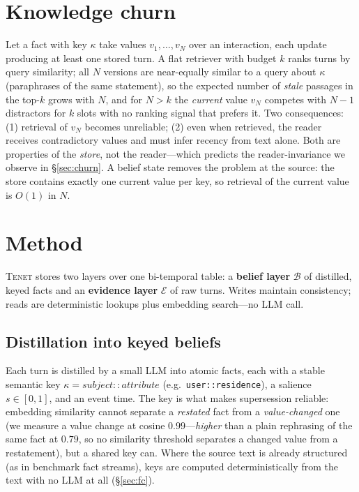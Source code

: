 \documentclass[11pt]{article}
\newcommand{\tenet}{\textsc{Tenet}}
\begin{document}
\section{Knowledge churn}\label{sec:problem}
Let a fact with key $\kappa$ take values $v_1,\dots,v_N$ over an interaction, each update
producing at least one stored turn. A flat retriever with budget $k$ ranks turns by
query similarity; all $N$ versions are near-equally similar to a query about $\kappa$
(paraphrases of the same statement), so the expected number of \emph{stale} passages in
the top-$k$ grows with $N$, and for $N>k$ the \emph{current} value $v_N$ competes with
$N-1$ distractors for $k$ slots with no ranking signal that prefers it. Two consequences:
(1) retrieval of $v_N$ becomes unreliable; (2) even when retrieved, the reader receives
contradictory values and must infer recency from text alone. Both are properties of the
\emph{store}, not the reader---which predicts the reader-invariance we observe in
\S\ref{sec:churn}. A belief state removes the problem at the source: the store contains
exactly one current value per key, so retrieval of the current value is $O(1)$ in $N$.

\section{Method}\label{sec:method}
\tenet{} stores two layers over one bi-temporal table: a \textbf{belief layer}
$\mathcal{B}$ of distilled, keyed facts and an \textbf{evidence layer} $\mathcal{E}$ of
raw turns. Writes maintain consistency; reads are deterministic lookups plus embedding
search---no LLM call.

\subsection{Distillation into keyed beliefs}
Each turn is distilled by a small LLM into atomic facts, each with a stable semantic key
$\kappa=\textit{subject}{::}\textit{attribute}$ (e.g.\ \texttt{user::residence}), a
salience $s\in[0,1]$, and an event time. The key is what makes supersession reliable:
embedding similarity cannot separate a \emph{restated} fact from a \emph{value-changed}
one (we measure a value change at cosine $0.99$---\emph{higher} than a plain rephrasing of
the same fact at $0.79$, so no similarity threshold separates a changed value from a
restatement), but a shared key can. Where the source text is already structured (as in
benchmark fact streams), keys are computed deterministically from the text with no LLM at
all (\S\ref{sec:fc}).
\end{document}
